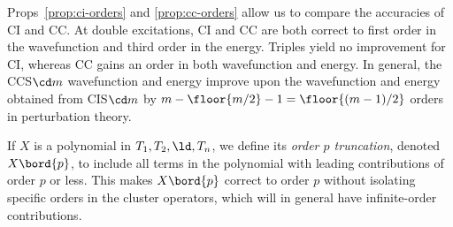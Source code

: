 \begin{prop}
\label{prop:cc-orders}
\end{prop}

\begin{ex}
Props~\ref{prop:ci-orders} and \ref{prop:cc-orders} allow us to compare the accuracies of CI and CC.
At double excitations, CI and CC are both correct to first order in the wavefunction and third order in the energy.
Triples yield no improvement for CI, whereas CC gains an order in both wavefunction and energy.
In general, the CCS${\cd}m$ wavefunction and energy improve upon the wavefunction and energy obtained from
CIS${\cd}m$ by
$
  m
-
  \floor{m/2}
-
  1
=
  \floor{(m-1)/2}
$
orders in perturbation theory.
\end{ex}

\begin{dfn}
If $X$ is a polynomial in $T_1,T_2,\ld,T_n$, we define
its \textit{order $p$ truncation}, denoted $X\bord{p}$,
to include all terms in the polynomial with leading contributions of order $p$ or less.
This makes $X\bord{p}$ correct to order $p$ without isolating specific orders in the cluster operators, which will in general have infinite-order contributions.
\end{dfn}


